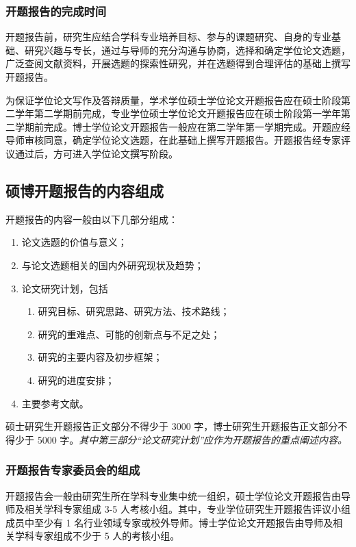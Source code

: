 \subsubsection{开题报告的完成时间}

开题报告前，研究生应结合学科专业培养目标、参与的课题研究、自身的专业基础、研究兴趣与专长，通过与导师的充分沟通与协商，选择和确定学位论文选题，广泛查阅文献资料，开展选题的探索性研究，并在选题得到合理评估的基础上撰写开题报告。

为保证学位论文写作及答辩质量，学术学位硕士学位论文开题报告应在硕士阶段第二学年第二学期前完成，专业学位硕士学位论文开题报告应在硕士阶段第一学年第二学期前完成。博士学位论文开题报告一般应在第二学年第一学期完成。开题应经导师审核同意，确定学位论文选题，在此基础上撰写开题报告。开题报告经专家评议通过后，方可进入学位论文撰写阶段。


\subsection{硕博开题报告的内容组成}


开题报告的内容一般由以下几部分组成：
\begin{enumerate}
  \item 论文选题的价值与意义；
  \item 与论文选题相关的国内外研究现状及趋势；
  \item 论文研究计划，包括
    \begin{enumerate}
      \item 研究目标、研究思路、研究方法、技术路线；
      \item 研究的重难点、可能的创新点与不足之处；
      \item 研究的主要内容及初步框架；
      \item 研究的进度安排；
    \end{enumerate}
  \item 主要参考文献。
\end{enumerate}

硕士研究生开题报告正文部分不得少于 3000 字，博士研究生开题报告正文部分不得少于 5000 字。\emph{其中第三部分“论文研究计划”应作为开题报告的重点阐述内容。}


\subsubsection{开题报告专家委员会的组成}

开题报告会一般由研究生所在学科专业集中统一组织，硕士学位论文开题报告由导师及相关学科专家组成 3-5 人考核小组。其中，专业学位研究生开题报告评议小组成员中至少有 1 名行业领域专家或校外导师。博士学位论文开题报告由导师及相关学科专家组成不少于 5 人的考核小组。


